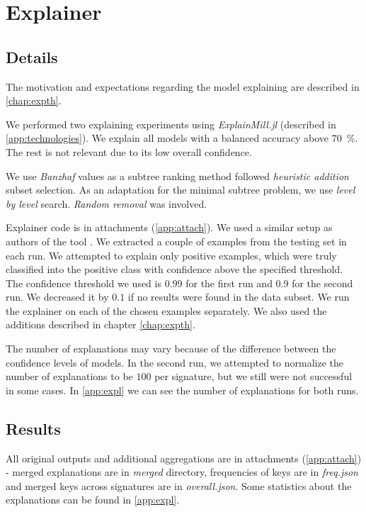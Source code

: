 \section{Explainer}
\subsection{Details}
The motivation and expectations regarding the model explaining are described in \ref{chap:expth}.

We performed two explaining experiments using \emph{ExplainMill.jl} (described in \ref{app:technologies}). We explain all models with a balanced accuracy above $70$~\%.  The rest is not relevant due to its low overall confidence.

We use \emph{Banzhaf} values as a subtree ranking method followed \emph{heuristic addition} subset selection. As an adaptation for the minimal subtree problem, we use \emph{level by level} search. \emph{Random removal} was involved.

Explainer code is in attachments (\ref{app:attach}). We used a similar setup as authors of the tool \cite{Pevny2020}. We extracted a couple of examples from the testing set in each run. We attempted to explain only positive examples, which were truly classified into the positive class with confidence above the specified threshold. The confidence threshold we used is $0.99$ for the first run and $0.9$ for the second run. We decreased it by $0.1$ if no results were found in the data subset. We run the explainer on each of the chosen examples separately. We also used the additions described in chapter \ref{chap:expth}.

The number of explanations may vary because of the difference between the confidence levels of models. In the second run, we attempted to normalize the number of explanations to be $100$ per signature, but we still were not successful in some cases.  In \ref{app:expl} we can see the number of explanations for both runs.

\subsection{Results}
All original outputs and additional aggregations are in attachments (\ref{app:attach}) - merged explanations are in \emph{merged} directory, frequencies of keys are in \emph{freq.json} and merged keys across signatures are in \emph{overall.json}. Some statistics about the explanations can be found in \ref{app:expl}.

